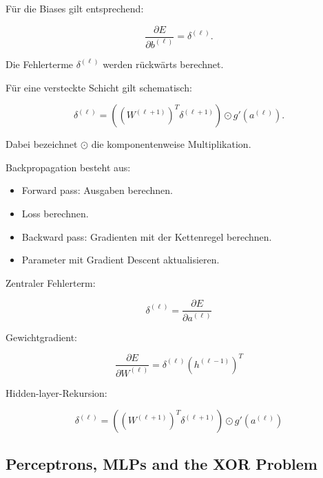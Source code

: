 \documentclass[11pt,a4paper]{scrartcl}
\begin{document}
\begin{calculationbox}
    Für die Biases gilt entsprechend:

    \[
        \frac{\partial E}{\partial b^{(\ell)}}
        =
        \delta^{(\ell)}.
    \]

    Die Fehlerterme \(\delta^{(\ell)}\) werden rückwärts berechnet.

    Für eine versteckte Schicht gilt schematisch:

    \[
        \delta^{(\ell)}
        =
        \left(
            (W^{(\ell+1)})^T
            \delta^{(\ell+1)}
        \right)
        \odot
        g'(a^{(\ell)}).
    \]

    Dabei bezeichnet \(\odot\) die komponentenweise Multiplikation.
\end{calculationbox}

\begin{answerbox}
    Backpropagation besteht aus:

    \begin{itemize}
        \item Forward pass: Ausgaben berechnen.
        \item Loss berechnen.
        \item Backward pass: Gradienten mit der Kettenregel berechnen.
        \item Parameter mit Gradient Descent aktualisieren.
    \end{itemize}

    Zentraler Fehlerterm:

    \[
        \boxed{
            \delta^{(\ell)}
            =
            \frac{\partial E}{\partial a^{(\ell)}}
        }
    \]

    Gewichtgradient:

    \[
        \boxed{
            \frac{\partial E}{\partial W^{(\ell)}}
            =
            \delta^{(\ell)}
            \left(h^{(\ell-1)}\right)^T
        }
    \]

    Hidden-layer-Rekursion:

    \[
        \boxed{
            \delta^{(\ell)}
            =
            \left(
                (W^{(\ell+1)})^T
                \delta^{(\ell+1)}
            \right)
            \odot
            g'(a^{(\ell)})
        }
    \]
\end{answerbox}

\subsection{Perceptrons, MLPs and the XOR Problem}
\end{document}
